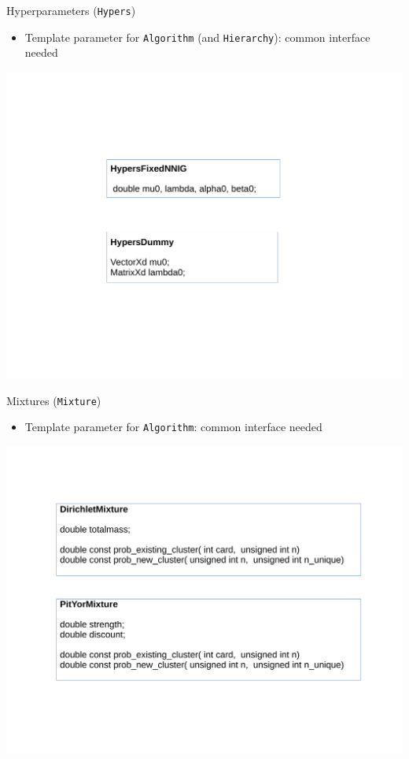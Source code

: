 \begin{frame}{Hyperparameters (\texttt{Hypers})}
\begin{itemize}
	\item Template parameter for \texttt{Algorithm} (and \texttt{Hierarchy}): common interface needed
\end{itemize}

\begin{center}
	\includegraphics[scale=0.35]{etc/hypers.pdf}
\end{center}
\end{frame}

\begin{frame}{Mixtures (\texttt{Mixture})}
\begin{itemize}
	\item Template parameter for \texttt{Algorithm}: common interface needed
\end{itemize}

\begin{center}
	\includegraphics[scale=0.35]{etc/mixture.pdf}
\end{center}

\end{frame}